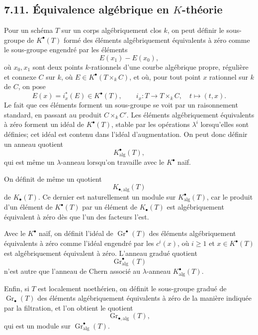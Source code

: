 \documentclass[11pt]{article}
\newcommand{\Gr}{\operatorname{Gr}}
\providecommand{\Gr}{\operatorname{Gr}}
\providecommand{\Gr}{\operatorname{G}}
\begin{document}
\subsection*{7.11. Équivalence algébrique en \(K\)-théorie}
Pour un schéma \(T\) sur un corps algébriquement clos \(k\), on peut définir le sous-groupe de \(K^\bullet(T)\) formé des éléments algébriquement équivalents à zéro comme le sous-groupe engendré par les éléments
\begin{equation}\tag{7.11.1}
  E(x_1)-E(x_0),
\end{equation}
où \(x_0,x_1\) sont deux points \(k\)-rationnels d'une courbe algébrique propre, régulière et connexe \(C\) sur \(k\), où \(E\in K^\bullet(T\times_k C)\), et où, pour tout point \(x\) rationnel sur \(k\) de \(C\), on pose
\[
  E(x)=i_x^*(E)\in K^\bullet(T),\qquad
  i_x:T\longrightarrow T\times_k C,\quad t\mapsto(t,x).
\]
Le fait que ces éléments forment un sous-groupe se voit par un raisonnement standard, en passant au produit \(C\times_k C'\). Les éléments algébriquement équivalents à zéro forment un idéal de \(K^\bullet(T)\), stable par les opérations \(\lambda^i\) lorsqu'elles sont définies; cet idéal est contenu dans l'idéal d'augmentation. On peut donc définir un anneau quotient
\begin{equation}\tag{7.11.2}
  K^\bullet_{\mathrm{alg}}(T),
\end{equation}
qui est même un \(\lambda\)-anneau lorsqu'on travaille avec le \(K^\bullet\) naïf.

On définit de même un quotient
\begin{equation}\tag{7.11.3}
  K_{\bullet,\mathrm{alg}}(T)
\end{equation}
de \(K_\bullet(T)\). Ce dernier est naturellement un module sur \(K^\bullet_{\mathrm{alg}}(T)\), car le produit d'un élément de \(K^\bullet(T)\) par un élément de \(K_\bullet(T)\) est algébriquement équivalent à zéro dès que l'un des facteurs l'est.

Avec le \(K^\bullet\) naïf, on définit l'idéal de \(\Gr^\bullet(T)\) des éléments algébriquement équivalents à zéro comme l'idéal engendré par les \(c^i(x)\), où \(i\geq1\) et \(x\in K^\bullet(T)\) est algébriquement équivalent à zéro. L'anneau gradué quotient
\begin{equation}\tag{7.11.4}
  \Gr^\bullet_{\mathrm{alg}}(T)
\end{equation}
n'est autre que l'anneau de Chern associé au \(\lambda\)-anneau \(K^\bullet_{\mathrm{alg}}(T)\).

Enfin, si \(T\) est localement noethérien, on définit le sous-groupe gradué de \(\Gr_\bullet(T)\) des éléments algébriquement équivalents à zéro de la manière indiquée par la filtration, et l'on obtient le quotient
\begin{equation}\tag{7.11.5}
  \Gr_{\bullet,\mathrm{alg}}(T),
\end{equation}
qui est un module sur \(\Gr^\bullet_{\mathrm{alg}}(T)\).
\end{document}
